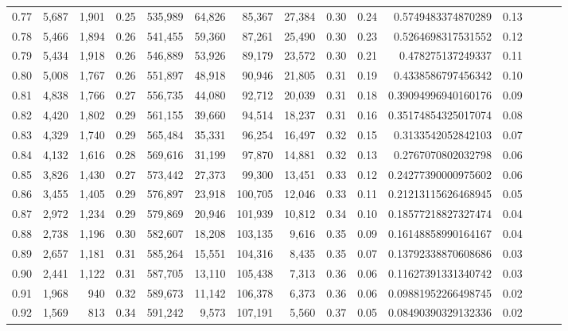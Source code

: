 \begin{tabular}{rrrrrrrrrrrrrrr}
0.77 &   5,687 &  1,901 &  0.25 &  535,989 &   64,826 &   85,367 &   27,384 &  0.30 &  0.24 &    0.5749483374870289 &      0.13 \\
0.78 &   5,466 &  1,894 &  0.26 &  541,455 &   59,360 &   87,261 &   25,490 &  0.30 &  0.23 &    0.5264698317531552 &      0.12 \\
0.79 &   5,434 &  1,918 &  0.26 &  546,889 &   53,926 &   89,179 &   23,572 &  0.30 &  0.21 &     0.478275137249337 &      0.11 \\
0.80 &   5,008 &  1,767 &  0.26 &  551,897 &   48,918 &   90,946 &   21,805 &  0.31 &  0.19 &    0.4338586797456342 &      0.10 \\
0.81 &   4,838 &  1,766 &  0.27 &  556,735 &   44,080 &   92,712 &   20,039 &  0.31 &  0.18 &   0.39094996940160176 &      0.09 \\
0.82 &   4,420 &  1,802 &  0.29 &  561,155 &   39,660 &   94,514 &   18,237 &  0.31 &  0.16 &   0.35174854325017074 &      0.08 \\
0.83 &   4,329 &  1,740 &  0.29 &  565,484 &   35,331 &   96,254 &   16,497 &  0.32 &  0.15 &    0.3133542052842103 &      0.07 \\
0.84 &   4,132 &  1,616 &  0.28 &  569,616 &   31,199 &   97,870 &   14,881 &  0.32 &  0.13 &    0.2767070802032798 &      0.06 \\
0.85 &   3,826 &  1,430 &  0.27 &  573,442 &   27,373 &   99,300 &   13,451 &  0.33 &  0.12 &   0.24277390000975602 &      0.06 \\
0.86 &   3,455 &  1,405 &  0.29 &  576,897 &   23,918 &  100,705 &   12,046 &  0.33 &  0.11 &   0.21213115626468945 &      0.05 \\
0.87 &   2,972 &  1,234 &  0.29 &  579,869 &   20,946 &  101,939 &   10,812 &  0.34 &  0.10 &   0.18577218827327474 &      0.04 \\
0.88 &   2,738 &  1,196 &  0.30 &  582,607 &   18,208 &  103,135 &    9,616 &  0.35 &  0.09 &   0.16148858990164167 &      0.04 \\
0.89 &   2,657 &  1,181 &  0.31 &  585,264 &   15,551 &  104,316 &    8,435 &  0.35 &  0.07 &   0.13792338870608686 &      0.03 \\
0.90 &   2,441 &  1,122 &  0.31 &  587,705 &   13,110 &  105,438 &    7,313 &  0.36 &  0.06 &   0.11627391331340742 &      0.03 \\
0.91 &   1,968 &    940 &  0.32 &  589,673 &   11,142 &  106,378 &    6,373 &  0.36 &  0.06 &   0.09881952266498745 &      0.02 \\
0.92 &   1,569 &    813 &  0.34 &  591,242 &    9,573 &  107,191 &    5,560 &  0.37 &  0.05 &   0.08490390329132336 &      0.02 \\

\end{tabular}
